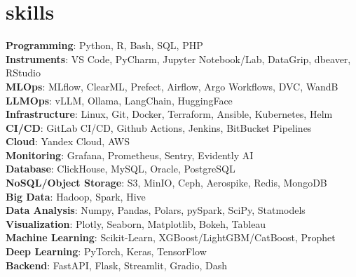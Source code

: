 \section{skills}
\begin{itemize}[leftmargin=0.15in, label={}]
  {\item{
        \textbf{Programming}{: Python, R, Bash, SQL, PHP} \\
        \textbf{Instruments}{: VS Code, PyCharm, Jupyter Notebook/Lab, DataGrip, dbeaver, RStudio} \\
        \textbf{MLOps}{: MLflow, ClearML, Prefect, Airflow, Argo Workflows, DVC, WandB} \\
        \textbf{LLMOps}{: vLLM, Ollama, LangChain, HuggingFace} \\
        \textbf{Infrastructure}{: Linux, Git, Docker, Terraform, Ansible, Kubernetes, Helm} \\
        \textbf{CI/CD}{: GitLab CI/CD, Github Actions, Jenkins, BitBucket Pipelines} \\
        \textbf{Cloud}{: Yandex Cloud, AWS} \\
        \textbf{Monitoring}{: Grafana, Prometheus, Sentry, Evidently AI} \\
        \textbf{Database}{: ClickHouse, MySQL, Oracle, PostgreSQL} \\
        \textbf{NoSQL/Object Storage}{: S3, MinIO, Ceph, Aerospike, Redis, MongoDB} \\
        \textbf{Big Data}{: Hadoop, Spark, Hive} \\
        \textbf{Data Analysis}{: Numpy, Pandas, Polars, pySpark, SciPy, Statmodels} \\
        \textbf{Visualization}{: Plotly, Seaborn, Matplotlib, Bokeh, Tableau} \\
        \textbf{Machine Learning}{: Scikit-Learn, XGBoost/LightGBM/CatBoost, Prophet} \\
        \textbf{Deep Learning}{: PyTorch, Keras, TensorFlow} \\
        \textbf{Backend}{: FastAPI, Flask, Streamlit, Gradio, Dash} \\
        }}
\end{itemize}